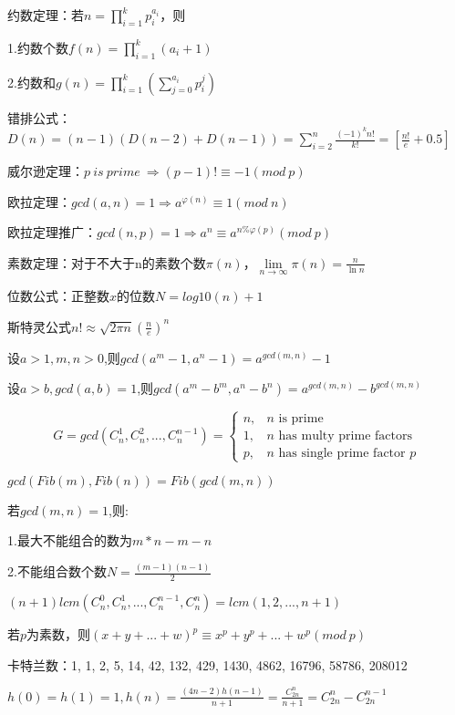 约数定理：若$n=\prod_{i=1}^kp_i^{a_i}$，则

1.约数个数$f(n)=\prod_{i=1}^k(a_i+1)$

2.约数和$g(n)=\prod_{i=1}^k(\sum_{j=0}^{a_i}p_i^j)$

错排公式：$D(n)=(n-1)(D(n-2)+D(n-1))=\sum_{i=2}^n\frac{(-1)^kn!}{k!}=[\frac{n!}{e}+0.5]$

威尔逊定理：$p\ is\ prime\ \Rightarrow (p-1)!\equiv-1(mod\ p)$

欧拉定理：$gcd(a,n)=1\Rightarrow a^{\varphi(n)}\equiv1(mod\ n)$

欧拉定理推广：$gcd(n,p)=1\Rightarrow a^n\equiv a^{n\%\varphi(p)}(mod\ p)$

素数定理：对于不大于n的素数个数$\pi(n)$，$\lim\limits_{n\to\infty}\pi(n)=\frac{n}{\ln n}$

位数公式：正整数$x$的位数$N=log10(n)+1$

斯特灵公式$n!\approx\sqrt{2\pi n}(\frac{n}{e})^n$

设$a>1,m,n>0$,则$gcd(a^m-1,a^n-1)=a^{gcd(m,n)}-1$

设$a>b,gcd(a,b)=1$,则$gcd(a^m-b^m,a^n-b^n)=a^{gcd(m,n)}-b^{gcd(m,n)}$

$$
G=gcd(C_n^1,C_n^2,...,C_n^{n-1})=
\begin{cases}
	n, & \text{$n$ is prime} \\
	1, & \text{$n$ has multy prime factors} \\
	p, & \text{$n$ has single prime factor $p$} 
\end{cases}
$$

$gcd(Fib(m),Fib(n))=Fib(gcd(m,n))$

若$gcd(m,n)=1$,则:

1.最大不能组合的数为$m*n-m-n$

2.不能组合数个数$N=\frac{(m-1)(n-1)}{2}$

$(n+1)lcm(C_n^0,C_n^1,...,C_n^{n-1},C_n^{n})=lcm(1,2,...,n+1)$

若$p$为素数，则$(x+y+...+w)^p\equiv x^p+y^p+...+w^p(mod\ p)$

卡特兰数：1, 1, 2, 5, 14, 42, 132, 429, 1430, 4862, 16796, 58786, 208012

$h(0)=h(1)=1,h(n)=\frac{(4n-2)h(n-1)}{n+1}=\frac{C_{2n}^n}{n+1}=C_{2n}^n-C_{2n}^{n-1}$

